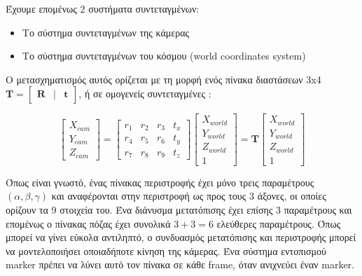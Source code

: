 Έχουμε επομένως 2 συστήματα συντεταγμένων:

\begin{itemize}
\item Το σύστημα συντεταγμένων της κάμερας 
\item Το σύστημα συντεταγμένων του κόσμου (world coordinates system)
\end{itemize}



Ο μετασχηματισμός αυτός ορίζεται με τη μορφή ενός πίνακα διαστάσεων 3x4 $\mathbf{T}=\begin{bmatrix}\mathbf{R} & | & \!\mathbf{t}\end{bmatrix}$, ή σε ομογενείς συντεταγμένες :

\begin{equation}
\begin{bmatrix}
X_{cam} \\ Y_{cam} \\ Z_{cam}
\end{bmatrix}
=
\begin{bmatrix}
r_{1} & r_{2} & r_{3} & t_{x}\\
r_{4} & r_{5} & r_{6} & t_{y}\\
r_{7} & r_{8} & r_{9} & t_{z}
\end{bmatrix}
\begin{bmatrix}
X_{world}\\
Y_{world}\\
Z_{world}\\
1
\end{bmatrix}
=\mathbf{T}\begin{bmatrix}
X_{world}\\
Y_{world}\\
Z_{world}\\
1
\end{bmatrix}
\end{equation}

Όπως είναι γνωστό, ένας πίνακας περιστροφής έχει μόνο τρεις παραμέτρους $(\alpha, \beta, \gamma)$ και αναφέρονται στην περιστροφή ως προς τους 3 άξονες, οι οποίες ορίζουν τα 9 στοιχεία του. Ένα διάνυσμα μετατόπισης έχει επίσης 3 παραμέτρους και επομένως ο πίνακας πόζας έχει συνολικά $3+3=6$ ελεύθερες παραμέτρους. Όπως μπορεί να γίνει εύκολα αντιληπτό, ο συνδυασμός μετατόπισης και περιστροφής μπορεί να μοντελοποιήσει οποιαδήποτε κίνηση της κάμερας. Ένα σύστημα εντοπισμού marker πρέπει να λύνει αυτό τον πίνακα σε κάθε frame, όταν ανιχνεύει έναν marker.





